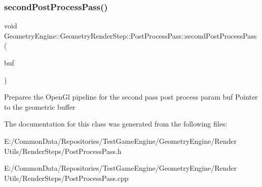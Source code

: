 \subsubsection{\texorpdfstring{secondPostProcessPass()}{secondPostProcessPass()}}
{\footnotesize\ttfamily void Geometry\+Engine\+::\+Geometry\+Render\+Step\+::\+Post\+Process\+Pass\+::second\+Post\+Process\+Pass (\begin{DoxyParamCaption}\item[{\mbox{\hyperlink{class_geometry_engine_1_1_geometry_buffer_1_1_g_buffer}{Geometry\+Buffer\+::\+G\+Buffer}} $\ast$}]{buf }\end{DoxyParamCaption})\hspace{0.3cm}{\ttfamily [protected]}}

Prepares the Open\+Gl pipeline for the second pass post process param buf Pointer to the geometric buffer 

The documentation for this class was generated from the following files\+:\begin{DoxyCompactItemize}
\item 
E\+:/\+Common\+Data/\+Repositories/\+Test\+Game\+Engine/\+Geometry\+Engine/\+Render Utils/\+Render\+Steps/Post\+Process\+Pass.\+h\item 
E\+:/\+Common\+Data/\+Repositories/\+Test\+Game\+Engine/\+Geometry\+Engine/\+Render Utils/\+Render\+Steps/Post\+Process\+Pass.\+cpp\end{DoxyCompactItemize}
